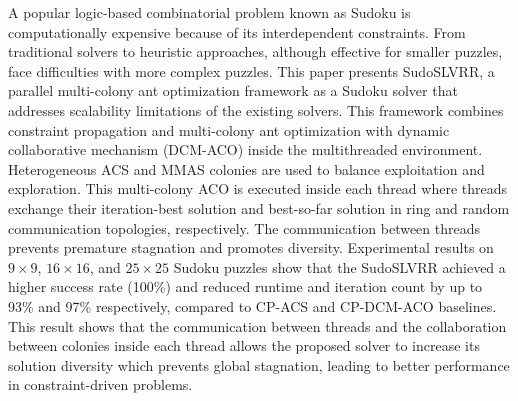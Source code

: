 A popular logic-based combinatorial problem known as Sudoku is computationally expensive because of its interdependent constraints. From traditional solvers to heuristic approaches, although effective for smaller puzzles, face difficulties with more complex puzzles. This paper presents SudoSLVRR, a parallel multi-colony ant optimization framework as a Sudoku solver that addresses scalability limitations of the existing solvers. This framework combines constraint propagation and multi-colony ant optimization with dynamic collaborative mechanism (DCM-ACO) inside the multithreaded environment. Heterogeneous ACS and MMAS colonies are used to balance exploitation and exploration. This multi-colony ACO is executed inside each thread where threads exchange their iteration-best solution and best-so-far solution in ring and random communication topologies, respectively. The communication between threads prevents premature stagnation and promotes diversity. Experimental results on $9 \times 9$, $16 \times 16$, and $25 \times 25$ Sudoku puzzles show that the SudoSLVRR achieved a higher success rate (100\%) and reduced runtime and iteration count by up to 93\% and 97\% respectively, compared to CP-ACS and CP-DCM-ACO baselines. This result shows that the communication between threads and the collaboration between colonies inside each thread allows the proposed solver to increase its solution diversity which prevents global stagnation, leading to better performance in constraint-driven problems. 



